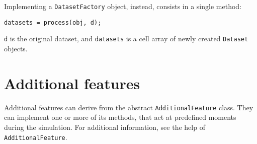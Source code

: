\noindent Implementing a \verb|DatasetFactory| object, instead, consists in a single method:

\begin{lstlisting}
datasets = process(obj, d);
\end{lstlisting}

\noindent \verb|d| is the original dataset, and \verb|datasets| is a cell array of newly created \verb|Dataset| objects.

\section{Additional features}

Additional features can derive from the abstract \verb|AdditionalFeature| class. They can implement one or more of its methods, that act at predefined moments during the simulation. For additional information, see the help of \verb|AdditionalFeature|.
